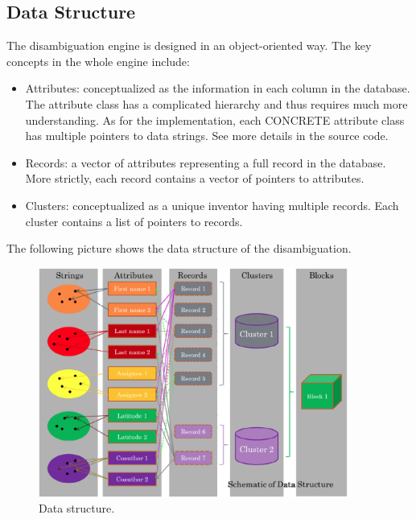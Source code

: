 \documentclass{article}
\begin{document}
\subsection{Data Structure}


The disambiguation engine is designed in an object-oriented
way. The key concepts in the whole engine include:


\begin{itemize}

\item Attributes: conceptualized as the information in each
column in the database. The attribute class has a complicated
hierarchy and thus requires much more understanding. As for the
implementation, each CONCRETE attribute class has multiple
pointers to data strings. See more details in the source code.

\item Records: a vector of attributes representing a full 
record in the database. More strictly, each
record contains a vector of pointers to attributes.

\item Clusters: conceptualized as a unique inventor having
multiple records. Each cluster contains a list of
pointers to records.

\end{itemize}


The following picture shows the data structure of the disambiguation.





\begin{figure}
\begin{center}
\includegraphics[width=4in]{images/disambiguation_data_structure.png}
\caption{Data structure.}
\label{fig:datastructure}
\end{center}
\end{figure}
\end{document}
